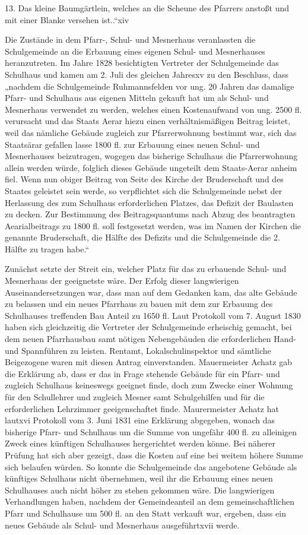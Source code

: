\documentclass[12pt,a4paper]{book}
\begin{document}
13. Das kleine Baumgärtlein, welches an die Scheune des Pfarrers anstoßt und mit
einer Blanke versehen ist..“xiv



Die Zustände in dem Pfarr-, Schul- und Mesnerhaus veranlassten die Schulgemeinde
an die Erbauung eines eigenen Schul- und Mesnerhauses heranzutreten. Im Jahre
1828 besichtigten Vertreter der Schulgemeinde das Schulhaus und kamen am 2. Juli
des gleichen Jahresxv zu den Beschluss, dass „nachdem die Schulgemeinde
Ruhmannsfelden vor ung. 20 Jahren das damalige Pfarr- und Schulhaus aus eigenen
Mitteln gekauft hat um als Schul- und Mesnerhaus verwendet zu werden, welches
einen Kostenaufwand von ung. 2500 fl. verursacht und das Staats Aerar hiezu
einen verhältnismäßigen Beitrag leistet, weil das nämliche Gebäude zugleich zur
Pfarrerwohnung bestimmt war, sich das Staatsärar gefallen lasse 1800 fl. zur
Erbauung eines neuen Schul- und Mesnerhauses beizutragen, wogegen das bisherige
Schulhaus die Pfarrerwohnung allein werden würde, folglich dieses Gebäude
ungeteilt dem Staats-Aerar anheim fiel. Wenn nun obiger Beitrag von Seite des
Kirche der Bruderschaft und des Staates geleistet sein werde, so verpflichtet
sich die Schulgemeinde nebst der Herlassung des zum Schulhaus erforderlichen
Platzes, das Defizit der Baulasten zu decken. Zur Bestimmung des
Beitragsquantums nach Abzug des beantragten Aearialbeitrags zu 1800 fl. soll
festgesetzt werden, was im Namen der Kirchen die genannte Bruderschaft, die
Hälfte des Defizits und die Schulgemeinde die 2. Hälfte zu tragen habe.“

Zunächst setzte der Streit ein, welcher Platz für das zu erbauende Schul- und
Mesnerhaus der geeignetste wäre. Der Erfolg dieser langwierigen
Auseinandersetzungen war, dass man auf dem Gedanken kam, das alte Gebäude zu
belassen und ein neues Pfarrhaus zu bauen mit dem zur Erbauung des Schulhauses
treffenden Bau Anteil zu 1650 fl. Laut Protokoll vom 7. August 1830 haben sich
gleichzeitig die Vertreter der Schulgemeinde erheischig gemacht, bei dem neuen
Pfarrhausbau samt nötigen Nebengebäuden die erforderlichen Hand- und Spannführen
zu leisten. Rentamt, Lokalschulinspektor und sämtliche Beigezogene waren mit
diesen Antrag einverstanden. Mauermeister Achatz gab die Erklärung ab, dass er
das in Frage stehende Gebäude für ein Pfarr- und zugleich Schulhaus keineswegs
geeignet finde, doch zum Zwecke einer Wohnung für den Schullehrer und zugleich
Mesner samt Schulgehilfen und für die erforderlichen Lehrzimmer geeigenschaftet
finde. Maurermeister Achatz hat lautxvi Protokoll vom 3. Juni 1831 eine
Erklärung abgegeben, wonach das bisherige Pfarr- und Schulhaus um die Summe von
ungefähr 400 fl. zu alleinigen Zweck eines künftigen Schulhauses hergerichtet
werden könne. Bei näherer Prüfung hat sich aber gezeigt, dass die Kosten auf
eine bei weitem höhere Summe sich belaufen würden. So konnte die Schulgemeinde
das angebotene Gebäude als künftiges Schulhaus nicht übernehmen, weil ihr die
Erbauung eines neuen Schulhauses auch nicht höher zu stehen gekommen wäre. Die
langwierigen Verhandlungen haben, nachdem der Gemeindeanteil an dem
gemeinschaftlichen Pfarr und Schulhause um 500 fl. an den Statt verkauft war,
ergeben, dass ein neues Gebäude als Schul- und Mesnerhaus ausgeführtxvii werde.
\end{document}
